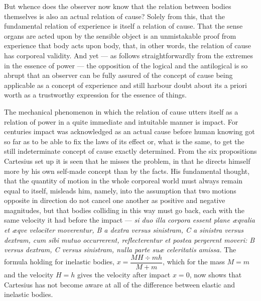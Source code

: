 \documentclass[12pt,a4paper]{book}
\begin{document}
But whence does the observer now know that the relation between bodies themselves is also an
actual relation of cause? Solely from this, that the fundamental relation of experience is
itself a relation of cause. That the sense organs are acted upon by the sensible object is an
unmistakable proof from experience that body acts upon body, that, in other words, the relation
of cause has corporeal validity. And yet --- as follows straightforwardly from the extremes in
the essence of power --- the opposition of the logical and the antilogical is so abrupt that an
observer can be fully assured of the concept of cause being applicable as a concept of
experience and still harbour doubt about its a priori worth as a trustworthy expression for the
essence of things.

The mechanical phenomenon in which the relation of cause utters itself
as a relation of power in a quite immediate and intuitable manner is impact. For centuries
impact was acknowledged as an actual cause before human knowing got so far as to be able to fix
the laws of its effect or, what is the same, to get the still indeterminate concept of cause
exactly determined. From the six propositions Cartesius set up it is seen that he misses the
problem, in that he directs himself more by his own self-made concept than by the facts. His
fundamental thought, that the quantity of motion in the whole corporeal world must always remain
equal to itself, misleads him, namely, into the assumption that two motions opposite in
direction do not cancel one another as positive and negative magnitudes, but that bodies
colliding in this way must go back, each with the same velocity it had before the impact ---
\textit{si duo illa corpora essent plane æqvalia et æqve velociter moverentur, B a dextra versus
sinistram, C a sinistra versus dextram, cum sibi mutuo occurrerent, reflecterentur et postea
pergerent moveri: B versus dextram, C versus sinistram, nulla parte suæ celeritatis amissa.} The
formula holding for inelastic bodies,
$x = \dfrac{MH \div mh}{M + m}$, which for the mass $M = m$ and the velocity $H = h$ gives the
velocity after impact $x = 0$, now shows that Cartesius has not become aware at all of the
difference between elastic and inelastic bodies.
\end{document}
